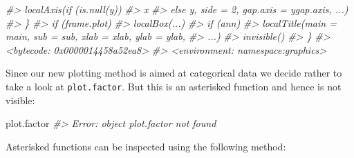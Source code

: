 \documentclass[
]{book}
\newenvironment{Shaded}{\begin{snugshade}}{\end{snugshade}}
\newcommand{\CommentTok}[1]{\textcolor[rgb]{0.56,0.35,0.01}{\textit{#1}}}
\newcommand{\NormalTok}[1]{#1}
\begin{document}
\begin{Shaded}
\begin{Highlighting}[]
\CommentTok{\#\textgreater{}         localAxis(if (is.null(y)) }
\CommentTok{\#\textgreater{}             x}
\CommentTok{\#\textgreater{}         else y, side = 2, gap.axis = ygap.axis, ...)}
\CommentTok{\#\textgreater{}     \}}
\CommentTok{\#\textgreater{}     if (frame.plot) }
\CommentTok{\#\textgreater{}         localBox(...)}
\CommentTok{\#\textgreater{}     if (ann) }
\CommentTok{\#\textgreater{}         localTitle(main = main, sub = sub, xlab = xlab, ylab = ylab, }
\CommentTok{\#\textgreater{}             ...)}
\CommentTok{\#\textgreater{}     invisible()}
\CommentTok{\#\textgreater{} \}}
\CommentTok{\#\textgreater{} \textless{}bytecode: 0x0000014458a52ea8\textgreater{}}
\CommentTok{\#\textgreater{} \textless{}environment: namespace:graphics\textgreater{}}
\end{Highlighting}
\end{Shaded}

Since our new plotting method is aimed at categorical data we decide rather to take a look at \texttt{plot.factor}. But this is an asterisked function and hence is not visible:

\begin{Shaded}
\begin{Highlighting}[]
\NormalTok{plot.factor}
\CommentTok{\#\textgreater{} Error: object \textquotesingle{}plot.factor\textquotesingle{} not found}
\end{Highlighting}
\end{Shaded}

Asterisked functions can be inspected using the following method:
\end{document}
